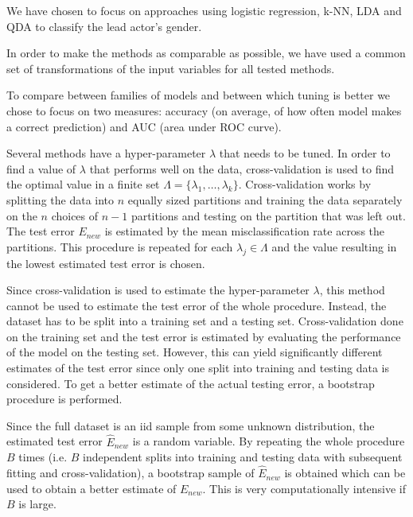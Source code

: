\documentclass[../../project.tex]{subfiles}
\begin{document}
	We have chosen to focus on approaches using logistic regression, k-NN, LDA and QDA to classify the lead actor's gender.
	
	In order to make the methods as comparable as possible, we have used a common set of transformations of the input variables for all tested methods.
	
	To compare between families of models and between which tuning is better we chose to focus on two measures: accuracy (on average, of how often model makes a correct prediction) and AUC (area under ROC curve).
	
	Several methods have a  hyper-parameter $\lambda$ that needs to be tuned. In order to find a value of $\lambda$ that performs well on the data, cross-validation is used to find the optimal value in a finite set $\Lambda = \{ \lambda_1,\dots,\lambda_k \}$. Cross-validation works by splitting the data into $n$ equally sized partitions and training the data separately on the $n$ choices of $n-1$ partitions and testing on the partition that was left out. The test error $E_{new}$ is estimated by the mean misclassification rate across the partitions. This procedure is repeated for each $\lambda_j \in \Lambda$ and the value resulting in the lowest estimated test error is chosen.
	
	Since cross-validation is used to estimate the hyper-parameter $\lambda$, this method cannot be used to estimate the test error of the whole procedure. Instead, the dataset has to be split into a training set and a testing set. Cross-validation done on the training set and the test error is estimated by evaluating the performance of the model on the testing set. However, this can yield significantly different estimates of the test error since only one split into training and testing data is considered. To get a better estimate of the actual testing error, a bootstrap procedure is performed.
	
	Since the full dataset is an iid sample from some unknown distribution, the estimated test error $\hat E_{new}$ is a random variable. By repeating the whole procedure $B$ times (i.e. $B$ independent splits into training and testing data with subsequent fitting and cross-validation), a bootstrap sample of $\hat E_{new}$ is obtained which can be used to obtain a better estimate of $E_{new}$. This is very computationally intensive if $B$ is large.
\end{document}
